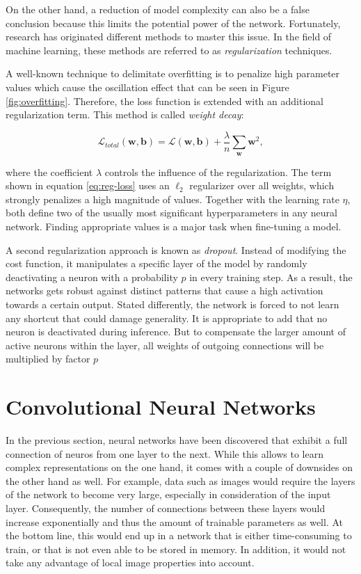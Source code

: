 On the other hand, a reduction of model complexity can also be a false conclusion because this limits the potential power of the network. Fortunately, research has originated different methods to master this issue. In the field of machine learning, these methods are referred to as \textit{regularization} techniques.

A well-known technique to delimitate overfitting is to penalize high parameter values which cause the oscillation effect that can be seen in Figure \ref{fig:overfitting}. Therefore, the loss function is extended with an additional regularization term. This method is called \textit{weight decay}:

\begin{equation} \label{eq:reg-loss}
  \mathcal{L}_{total}(\textbf{w}, \textbf{b})= \mathcal{L}(\textbf{w}, \textbf{b}) + \frac{\lambda}{n} \sum\limits_{\textbf{w}}\textbf{w}^2 ,
\end{equation}

where the coefficient $ \lambda $ controls the influence of the regularization. The term shown in equation \ref{eq:reg-loss} uses an $ \ell_{2} $ regularizer over all weights, which strongly penalizes a high magnitude of values. Together with the learning rate $ \eta $, both define two of the usually most significant hyperparameters in any neural network. Finding appropriate values is a major task when fine-tuning a model.

A second regularization approach is known as \textit{dropout}. Instead of modifying the cost function, it manipulates a specific layer of the model by randomly deactivating a neuron with a probability $p$ in every training step. As a result, the networks gets robust against distinct patterns that cause a high activation towards a certain output. Stated differently, the network is forced to not learn any shortcut that could damage generality. It is appropriate to add that no neuron is deactivated during inference. But to compensate the larger amount of active neurons within the layer, all weights of outgoing connections will be multiplied by factor $ p $ \parencite[p. 1931]{dropout}



\section{Convolutional Neural Networks}

In the previous section, neural networks have been discovered that exhibit a full connection of neuros from one layer to the next. While this allows to learn complex representations on the one hand, it comes with a couple of downsides on the other hand as well. For example, data such as images would require the layers of the network to become very large, especially in consideration of the input layer. Consequently, the number of connections between these layers would increase exponentially and thus the amount of trainable parameters as well. At the bottom line, this would end up in a network that is either time-consuming to train, or that is not even able to be stored in memory. In addition, it would not take any advantage of local image properties into account.

